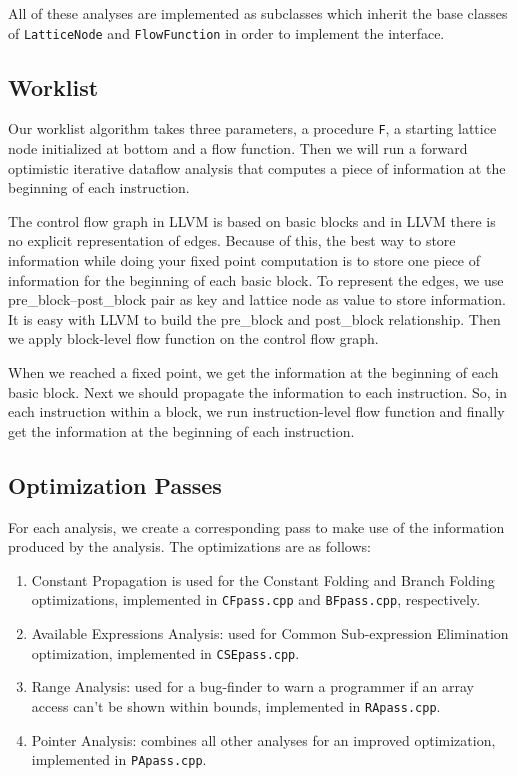 \documentclass[paper=letter, fontsize=11pt]{scrartcl}
\numberwithin{equation}{section}		%
\numberwithin{figure}{section}			%
\numberwithin{table}{section}				%
\begin{document}
All of these analyses are implemented as subclasses which inherit the base classes of \texttt{LatticeNode} and \texttt{FlowFunction} in order to implement the interface.

\subsection{Worklist}
Our worklist algorithm takes three parameters, a procedure \texttt{F}, a starting lattice node initialized at bottom and a flow function. Then we will run a forward optimistic iterative dataflow analysis that computes a piece of information at the beginning of each instruction.

The control flow graph in LLVM is based on basic blocks and in LLVM there is no explicit representation of edges. Because of this, the best way to store information while doing your fixed point computation is to store one piece of information for the beginning of each basic block. To represent the edges, we use pre\_block--post\_block pair as key and lattice node as value to store information. It is easy with LLVM to build the pre\_block and post\_block relationship. Then we apply block-level flow function on the control flow graph.

When we reached a fixed point, we get the information at the beginning of each basic block. Next we should propagate the information to each instruction. So, in each instruction within a block, we run instruction-level flow function and finally get the information at the beginning of each instruction.

\subsection{Optimization Passes}

For each analysis, we create a corresponding pass to make use of the information produced by the analysis. The optimizations are as follows:
\begin{enumerate}
\item Constant Propagation is used for the Constant Folding and Branch Folding optimizations, implemented in \texttt{CFpass.cpp} and \texttt{BFpass.cpp}, respectively.
\item Available Expressions Analysis: used for Common Sub-expression Elimination optimization, implemented in \texttt{CSEpass.cpp}.
\item Range Analysis: used for a bug-finder to warn a programmer if an array access can't be shown within bounds, implemented in \texttt{RApass.cpp}.
\item Pointer Analysis: combines all other analyses for an improved optimization, implemented in \texttt{PApass.cpp}.	
\end{enumerate}








\end{document}
